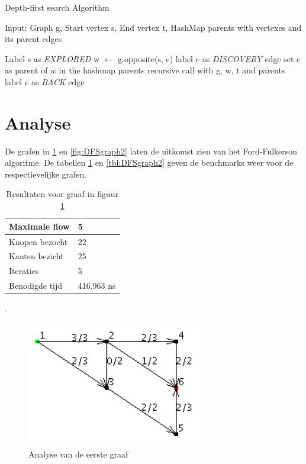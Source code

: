 \begin{algorithm}[h]
\caption{Depth-first search Algorithm}
\label{alg:DFS}
\begin{algorithmic}
\REQUIRE Input: Graph g, Start vertex s, End vertex t, HashMap parents with vertexes and its parent edges

\STATE Label s as \textit{EXPLORED}
\STATE w $\gets$ g.opposite(s, e)
\STATE label $e$ as \textit{DISCOVERY} edge
\STATE set $e$ as parent of $w$ in the hashmap parents
\STATE recursive call with g, w, t and parents
\ELSE
\STATE label $e$ as \textit{BACK} edge
\ENDIF
\ENDIF
\ENDFOR
\end{algorithmic}
\end{algorithm}

\section{Analyse}

De grafen in \ref{fig:DFSgraph1} en \ref{fig:DFSgraph2} laten de uitkomst zien van het Ford-Fulkerson algoritme. De tabellen \ref{tbl:DFSgraph1} en \ref{tbl:DFSgraph2} geven de benchmarks weer voor de respectievelijke grafen.

\begin{table}[h]
 \begin{tabularx}{\linewidth}{| l | X |}
 \hline
 Maximale flow & 5 \\
 \hline
 Knopen bezocht & 22 \\
 \hline
 Kanten bezicht & 25 \\
 \hline
 Iteraties & 5 \\
 \hline
 Benodigde tijd & 416.963 ns \\
 \hline
\end{tabularx}
\centering
\caption{Resultaten voor graaf in figuur \ref{fig:DFSgraph1}}.
\label{tbl:DFSgraph1}
\end{table}

\begin{figure}[h]
	\includegraphics{depthfirst/DFSgraph1}
	\centering
	\caption{Analyse van de eerste graaf}
	\label{fig:DFSgraph1}
\end{figure}

